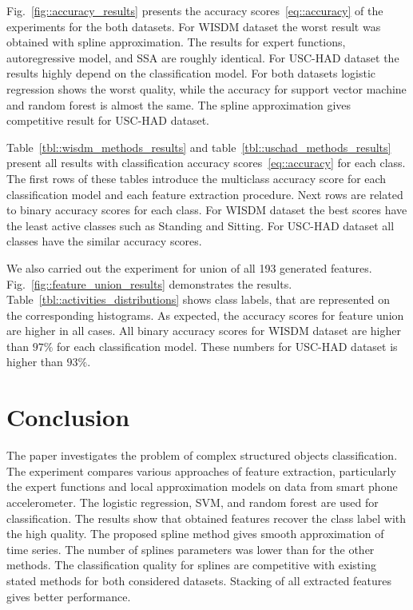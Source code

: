 \documentclass{llncs}
\begin{document}
Fig.~\ref{fig::accuracy_results} presents the accuracy scores~\eqref{eq::accuracy} of the experiments for the both datasets. For WISDM dataset the worst result was obtained with spline approximation. 
The results for expert functions, autoregressive model, and SSA are roughly identical. For USC-HAD dataset the results highly depend on the classification model. 
For both datasets logistic regression shows the worst quality, while the accuracy for support vector machine and random forest is almost the same. The spline approximation gives competitive result for USC-HAD dataset.

Table~\ref{tbl::wisdm_methods_results} and table~\ref{tbl::uschad_methods_results} present all results with classification accuracy scores~\eqref{eq::accuracy} for each class. The first rows of these tables introduce the multiclass accuracy score for each classification model and each feature extraction procedure. Next rows are related to binary accuracy scores for each class. For WISDM dataset the best scores have the least active classes such as Standing and Sitting. For USC-HAD dataset all classes have the similar accuracy scores.

We also carried out the experiment for union of all 193 generated features. Fig.~\ref{fig::feature_union_results} demonstrates the results. Table~\ref{tbl::activities_distributions} shows class labels, that are represented on the corresponding histograms. As expected, the accuracy scores for feature union are higher in all cases. All binary accuracy scores for WISDM dataset are higher than $97 \%$ for each classification model. These numbers for USC-HAD dataset is higher than $93 \%$.

\section{Conclusion}

The paper investigates the problem of complex structured objects classification.
The experiment compares various approaches of feature extraction, particularly the expert functions and local approximation models on data from smart phone accelerometer.
The logistic regression, SVM, and random forest are used for classification. 
The results show that obtained features recover the class label with the high quality. 
The proposed spline method gives smooth approximation of time series. 
The number of splines parameters was lower than for the other methods. 
The classification quality for splines are competitive with existing stated methods for both considered datasets.  
Stacking of all extracted features gives better performance.
\end{document}
